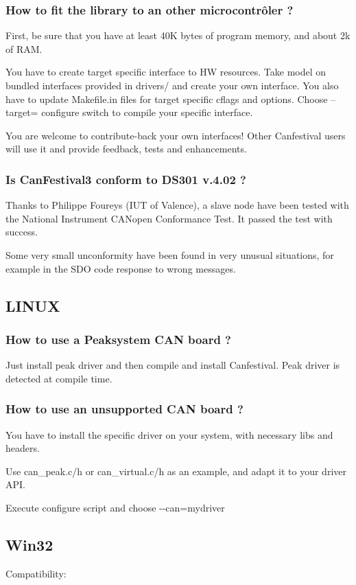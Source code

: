 \documentclass[a4paper,12pt]{book}
\newcommand{\canopen}{CANopen}
\begin{document}
\subsubsection{How to fit the library to an other microcontr\^oler ?}
First, be sure that you have at least 40K bytes of program memory, and
about 2k of RAM. 

You have to create target specific interface to HW resources. Take model
on bundled interfaces provided in drivers/ and create your own
interface. You also have to update Makefile.in files for target
specific cflags and options. Choose {--}target= configure switch to
compile your specific interface.

You are welcome to contribute{}-back your own interfaces! Other
Canfestival users will use it and provide feedback, tests and
enhancements.

\subsubsection{Is CanFestival3 conform to DS301 v.4.02 ?}
Thanks to Philippe Foureys (IUT of Valence), a slave node have been
tested with the National Instrument \canopen{} Conformance Test. It passed
the test with success.

Some very small unconformity have been found in very unusual situations,
for example in the SDO code response to wrong messages.

\subsection{LINUX}
\subsubsection{How to use a Peaksystem CAN board ?}
Just install peak driver and then compile and install Canfestival. Peak
driver is detected at compile time.

\subsubsection{How to use an unsupported CAN board ?}
You have to install the specific driver on your system, with necessary
libs and headers. 

Use can\_peak.c/h or can\_virtual.c/h as an example, and adapt it to
your driver API.

Execute configure script and choose {}-{}-can=mydriver

\subsection{Win32}
Compatibility:
\end{document}
